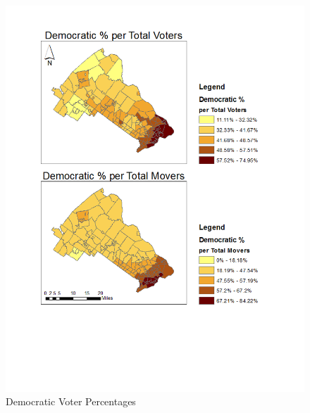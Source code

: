 \documentclass[]{article}
\begin{document}
\begin{figure}[htbp]
\centering
\includegraphics{question_1.png}
\caption{Democratic Voter Percentages}
\end{figure}
\end{document}
